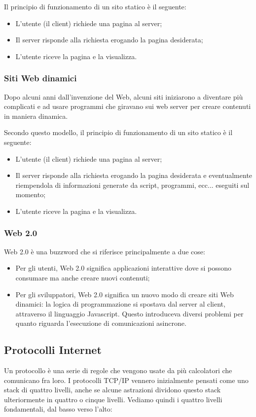 \documentclass[a4paper,11pt]{article}
\begin{document}
Il principio di funzionamento di un sito statico è il seguente:
\begin{itemize}
	\item L'utente (il client) richiede una pagina al server;
	\item Il server risponde alla richiesta erogando la pagina desiderata;
	\item L'utente riceve la pagina e la visualizza.
\end{itemize}

\subsubsection{Siti Web dinamici}
Dopo alcuni anni dall'invenzione del Web, alcuni siti iniziarono a diventare più complicati e ad usare programmi che giravano sui web server per creare contenuti in maniera dinamica.

Secondo questo modello, il principio di funzionamento di un sito statico è il seguente:
\begin{itemize}
	\item L'utente (il client) richiede una pagina al server;
	\item Il server risponde alla richiesta erogando la pagina desiderata e eventualmente riempendola di informazioni generate da script, programmi, ecc... eseguiti sul momento;
	\item L'utente riceve la pagina e la visualizza.
\end{itemize}

\subsubsection{Web 2.0}
Web 2.0 è una buzzword che si riferisce principalmente a due cose:

\begin{itemize}
	\item Per gli utenti, Web 2.0 significa applicazioni interattive dove si possono consumare ma anche creare nuovi contenuti;
	\item Per gli sviluppatori, Web 2.0 significa un nuovo modo di creare siti Web dinamici: la logica di programmazione si spostava dal server al client, attraverso il linguaggio Javascript.
		Questo introduceva diversi problemi per quanto riguarda l'esecuzione di comunicazioni asincrone.
\end{itemize}

\subsection{Protocolli Internet}
Un protocollo è una serie di regole che vengono usate da più calcolatori che comunicano fra loro.
I protocolli TCP/IP vennero inizialmente pensati come uno stack di quattro livelli, anche se alcune astrazioni dividono questo stack ulteriormente in quattro o cinque livelli.
Vediamo quindi i quattro livelli fondamentali, dal basso verso l'alto:
\end{document}
